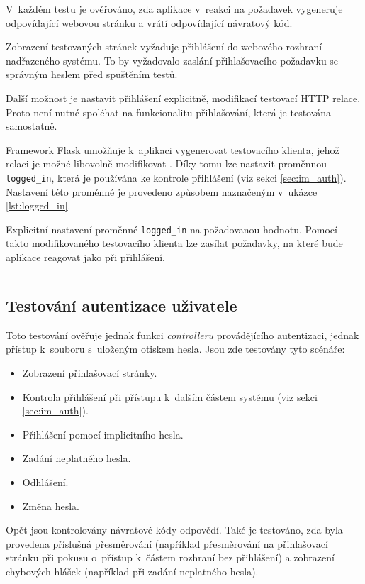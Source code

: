 V~každém testu je ověřováno, zda aplikace v~reakci na požadavek vygeneruje odpovídající webovou stránku a vrátí odpovídající návratový kód.

Zobrazení testovaných stránek vyžaduje přihlášení do webového rozhraní nadřazeného systému. To by vyžadovalo zaslání přihlašovacího požadavku se správným heslem před spuštěním testů.

Další možnost je nastavit přihlášení explicitně, modifikací testovací HTTP relace. Proto není nutné spoléhat na funkcionalitu přihlašování, která je testována samostatně.

Framework Flask umožňuje k~aplikaci vygenerovat testovacího klienta, jehož relaci je možné libovolně modifikovat \cite{flask_testing}. Díky tomu lze nastavit proměnnou \texttt{logged\_in}, která je používána ke kontrole přihlášení (viz sekci \ref{sec:im_auth}). Nastavení této proměnné je provedeno způsobem naznačeným v~ukázce \ref{lst:logged_in}.

\begin{listing}[htbp]
\caption{\label{lst:logged_in} Explicitní nastavení proměnné \texttt{logged\_in} na požadovanou hodnotu. Pomocí takto modifikovaného testovacího klienta lze zasílat požadavky, na které bude aplikace reagovat jako při přihlášení.}
\inputminted[bgcolor=codebg]{python}{source-samples/logged_in.py}
\end{listing}

\subsection{Testování autentizace uživatele}

Toto testování ověřuje jednak funkci \textit{controlleru} provádějícího autentizaci, jednak přístup k~souboru s~uloženým otiskem hesla. Jsou zde testovány tyto scénáře:

\begin{itemize}
    \item Zobrazení přihlašovací stránky.
    \item Kontrola přihlášení při přístupu k~dalším částem systému (viz sekci \ref{sec:im_auth}).
    \item Přihlášení pomocí implicitního hesla.
    \item Zadání neplatného hesla.
    \item Odhlášení.
    \item Změna hesla.
\end{itemize}

Opět jsou kontrolovány návratové kódy odpovědí. Také je testováno, zda byla provedena příslušná přesměrování (například přesměrování na přihlašovací stránku při pokusu o~přístup k~částem rozhraní bez přihlášení) a zobrazení chybových hlášek (například při zadání neplatného hesla).


